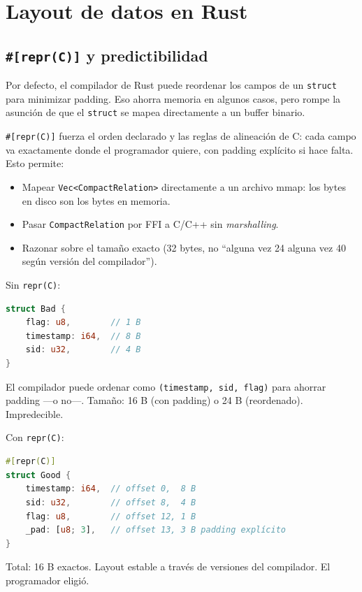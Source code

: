 \section{Layout de datos en Rust}

\subsection{\texttt{\#[repr(C)]} y predictibilidad}

Por defecto, el compilador de Rust puede reordenar los campos de un
\texttt{struct} para minimizar padding. Eso ahorra memoria en algunos
casos, pero rompe la asunción de que el \texttt{struct} se mapea
directamente a un buffer binario.

\texttt{\#[repr(C)]} fuerza el orden declarado y las reglas de
alineación de C: cada campo va exactamente donde el programador
quiere, con padding explícito si hace falta. Esto permite:

\begin{itemize}
    \item Mapear \texttt{Vec<CompactRelation>} directamente a un
    archivo mmap: los bytes en disco son los bytes en memoria.
    \item Pasar \texttt{CompactRelation} por FFI a C/C++ sin
    \emph{marshalling}.
    \item Razonar sobre el tamaño exacto (32 bytes, no ``alguna vez
    24 alguna vez 40 según versión del compilador'').
\end{itemize}

\begin{ejemplo}
Sin \texttt{repr(C)}:
\begin{lstlisting}[language=Rust]
struct Bad {
    flag: u8,        // 1 B
    timestamp: i64,  // 8 B
    sid: u32,        // 4 B
}
\end{lstlisting}
El compilador puede ordenar como \texttt{(timestamp, sid, flag)} para
ahorrar padding ---o no---. Tamaño: 16 B (con padding) o 24 B
(reordenado). Impredecible.

Con \texttt{repr(C)}:
\begin{lstlisting}[language=Rust]
#[repr(C)]
struct Good {
    timestamp: i64,  // offset 0,  8 B
    sid: u32,        // offset 8,  4 B
    flag: u8,        // offset 12, 1 B
    _pad: [u8; 3],   // offset 13, 3 B padding explícito
}
\end{lstlisting}
Total: 16 B exactos. Layout estable a través de versiones del
compilador. El programador eligió.
\end{ejemplo}

